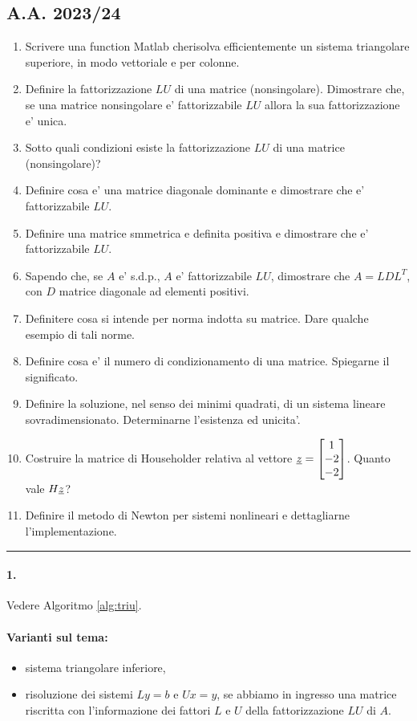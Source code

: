 \subsection{A.A. 2023/24}
\begin{enumerate}
	\item Scrivere una function Matlab cherisolva efficientemente un sistema triangolare superiore, in modo vettoriale e per colonne.
	\item Definire la fattorizzazione $LU$ di una matrice (nonsingolare). Dimostrare che, se una matrice nonsingolare e' fattorizzabile $LU$ allora la sua fattorizzazione e' unica.
	\item Sotto quali condizioni esiste la fattorizzazione $LU$ di una matrice (nonsingolare)?
	\item Definire cosa e' una matrice diagonale dominante e dimostrare che e' fattorizzabile $LU$.
	\item Definire una matrice smmetrica e definita positiva e dimostrare che e' fattorizzabile $LU$.
	\item Sapendo che, se $A$ e' s.d.p., $A$ e' fattorizzabile $LU$, dimostrare che $A=LDL^T$, con $D$ matrice diagonale ad elementi positivi.
	\item Definitere cosa si intende per norma indotta su matrice. Dare qualche esempio di tali norme.
	\item Definire cosa e' il numero di condizionamento di una matrice. Spiegarne il significato.
	\item Definire la soluzione, nel senso dei minimi quadrati, di un sistema lineare sovradimensionato. Determinarne l'esistenza ed unicita'.
	\item Costruire la matrice di Householder relativa al vettore $\uline z = \begin{bmatrix}
		1\\
		-2\\
		-2
	\end{bmatrix}$. Quanto vale $H\uline z$?
	\item Definire il metodo di Newton per sistemi nonlineari e dettagliarne l'implementazione.
\end{enumerate}

\hrule

\paragraph{1.} Vedere Algoritmo \ref{alg:triu}.
\paragraph{Varianti sul tema:}
\begin{itemize}
	\item sistema triangolare inferiore,
	\item risoluzione dei sistemi $Ly=b$ e $Ux=y$, se abbiamo in ingresso una matrice riscritta con l'informazione dei fattori $L$ e $U$ della fattorizzazione $LU$ di $A$.
\end{itemize}

